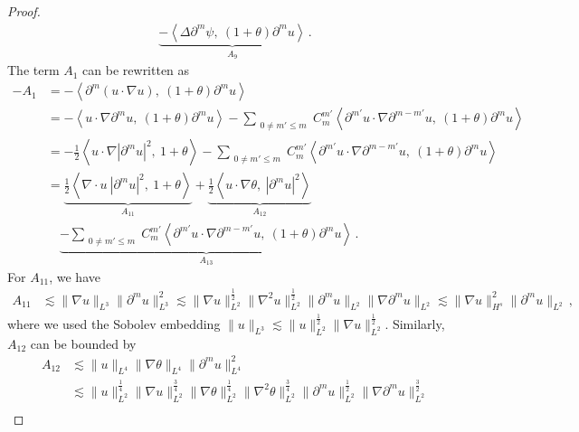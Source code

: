 \documentclass[reqno,11pt]{amsart}
\numberwithin{equation}{section}
\def\p{\partial}
\begin{document}
\begin{proof}
\begin{equation}
\begin{aligned}
\underset{A_9}{\underbrace{- \left\langle \Delta \partial^m \psi,\ (1+\theta) \partial^m u \right\rangle}} \,.
\end{aligned}
\end{equation}
The term $A_1$ can be rewritten as
\begin{equation*}
\begin{aligned}
-A_1&=-\left\langle \partial^m(u\cdot\nabla u),\ (1+\theta)\partial^m u\right\rangle \\
&= -\left\langle u\cdot\nabla\partial^m u,\ (1+\theta)\partial^m u\right\rangle -\sum_{\substack{0\neq m'\leq m}} C_m^{m'}\left\langle \partial^{m'}u\cdot\nabla\partial^{m-m'}u,\ (1+\theta)\partial^m u\right\rangle \\
&= -\frac{1}{2}\left\langle u\cdot\nabla|\partial^m u|^2,\ 1+\theta\right\rangle -\sum_{\substack{0\neq m'\leq m}} C_m^{m'}\left\langle \partial^{m'}u\cdot\nabla\partial^{m-m'}u,\ (1+\theta)\partial^m u\right\rangle \\
&= \underset{A_{11}}{\underbrace{\frac{1}{2}\left\langle \nabla\cdot u\ |\partial^m u|^2,\ 1+\theta\right\rangle }}+\underset{A_{12}}{\underbrace{\frac{1}{2}\left\langle u\cdot\nabla\theta,\ |\partial^m u|^2\right\rangle}} \\
&\quad \underset{A_{13}}{\underbrace{-\sum_{\substack{0\neq m'\leq m}} C_m^{m'}\left\langle \partial^{m'}u\cdot\nabla\partial^{m-m'}u,\ (1+\theta)\partial^m u\right\rangle}} \,.
\end{aligned}
\end{equation*}
For $A_{11}$, we have
\begin{equation*}
\begin{aligned}
{A_{11}} &\lesssim\|\nabla u\|_{L^3}\|\p^m u\|^2_{L^3} \lesssim\|\nabla u\|^{\frac{1}{2}}_{L^2}\|\nabla^2 u\|^{\frac{1}{2}}_{L^2}\|\p^m u\|_{L^2}\|\nabla\p^m u\|_{L^2} \lesssim\|\nabla u\|^2_{H^s}\|\p^m u\|_{L^2} \,,
\end{aligned}
\end{equation*}
where we used the Sobolev embedding $ \|u\|_{L^3} \lesssim \| u \|^{ \frac{1}{2} }_{L^2} \| \nabla u \|^{ \frac{1}{2} }_{L^2}$. Similarly, $A_{12}$ can be bounded by
\begin{equation*}
\begin{aligned}
{A_{12}}&\lesssim\|u\|_{L^4} \|\nabla\theta\|_{L^4} \|\partial^m u\|_{L^4}^2 \\
&\lesssim \|u\|_{L^2}^{\frac{1}{4}} \|\nabla u\|_{L^2}^{\frac{3}{4}} \|\nabla\theta\|_{L^2}^{\frac{1}{4}} \|\nabla^2\theta\|_{L^2}^{\frac{3}{4}} \|\partial^m u\|_{L^2}^{\frac{1}{2}}\|\nabla\partial^m u\|_{L^2}^{\frac{3}{2}} \\

\end{aligned}
\end{equation*}
\end{proof}
\end{document}
